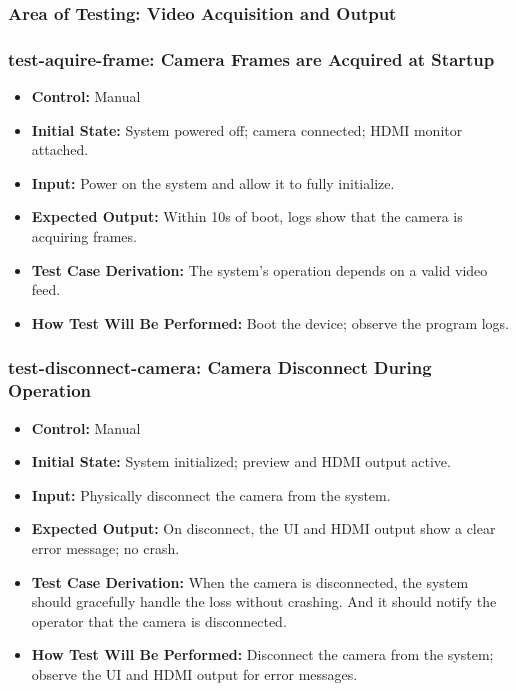 \documentclass[12pt, titlepage]{article}
\begin{document}
\subsubsection{Area of Testing: Video Acquisition and Output}

\subsubsection*{test-aquire-frame: Camera Frames are Acquired at Startup}
\begin{itemize}
  \item \textbf{Control:} Manual
  \item \textbf{Initial State:} System powered off; camera connected; HDMI monitor attached.
  \item \textbf{Input:} Power on the system and allow it to fully initialize.
  \item \textbf{Expected Output:} Within 10s of boot, logs show that the camera is acquiring frames.
  \item \textbf{Test Case Derivation:} The system's operation depends on a valid video feed.
  \item \textbf{How Test Will Be Performed:} Boot the device; observe the program logs.
\end{itemize}

\subsubsection*{test-disconnect-camera: Camera Disconnect During Operation}
\begin{itemize}
  \item \textbf{Control:} Manual
  \item \textbf{Initial State:} System initialized; preview and HDMI output active.
  \item \textbf{Input:} Physically disconnect the camera from the system.
  \item \textbf{Expected Output:} On disconnect, the UI and HDMI output show a clear error message; no crash.
  \item \textbf{Test Case Derivation:} When the camera is disconnected, the system should gracefully handle the loss without crashing. And it should notify the operator that the camera is disconnected.
  \item \textbf{How Test Will Be Performed:} Disconnect the camera from the system; observe the UI and HDMI output for error messages.
\end{itemize}
\end{document}
